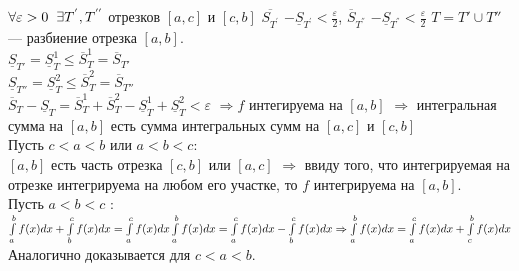 \documentclass[a4paper,12pt]{article} %
\begin{document}
\begin{enumerate}
    $ \forall \varepsilon > 0 \hspace*{2mm}  \exists T^{'}, T^{''} $ отрезков $ [a, c]  $ и $ [c, b]  $ \hspace*{2mm}  $\overline {S_{T^'}}$ $ - {\underline{S}_{T^'}}  <  {\frac{\varepsilon}{2}} $, \hspace*{2mm}  \vspace*{1mm}
    $\overline {S}_{T^{''}}$ $ - {\underline{S}_{T^{''}}}  <  {\frac{\varepsilon}{2}} $ \newline
    $T = T' \cup T{''}$ --- разбиение отрезка $ [a,b] $. \\[2mm]
    $ \underline{S}_{T'} =  \underline{S}_{T}^1 \leq \overline{S}_{T}^1 = \overline{S}_{T'} $ \\ [2mm]
    $ \underline{S}_{T''} =  \underline{S}_{T}^2 \leq \overline{S}_{T}^2 = \overline{S}_{T''} $ \\ [2mm]
    $ \overline{S}_{T} -  \underline{S}_{T} = \overline{S}_{T}^1 + \overline{S}_{T}^2 - \underline{S}_{T}^1 + \underline{S}_{T}^2 < \varepsilon $ $ \Rightarrow f $ интегируема на $ [a, b]$ $ \Rightarrow $ интегральная сумма на $ [a, b] $ есть сумма интегральных сумм на $ [a,c] $ и $ [c, b] $ \\ [2mm]
    \hspace*{5mm} Пусть $ c < a < b $ или $ a < b < c $: \\[2 mm]
    $ [a, b] $ есть часть отрезка $ [c, b] $ или $ [a, c] $ $ \Rightarrow $ ввиду того, что интегрируемая на отрезке интегрируема на любом его участке, то $ f $ интегрируема на $ [a, b] $. \\ [2 mm]
    \hspace*{5mm} Пусть $ a < b < c $ : \\[2 mm]
    $\int\limits_a^b f(x)dx + \int\limits_b^c f(x)dx = \int\limits_a^c f(x)dx  \newline
    \int\limits_a^b f(x)dx = \int\limits_a^c f(x)dx - \int\limits_b^c f(x)dx  \Rightarrow \int\limits_a^b f(x)dx = \int\limits_a^c f(x)dx + \int\limits_c^b f(x)dx $ \\ [2mm]
    Аналогично доказывается для $ c < a < b$. \\ [2mm]
    

\end{enumerate}
\end{document}
